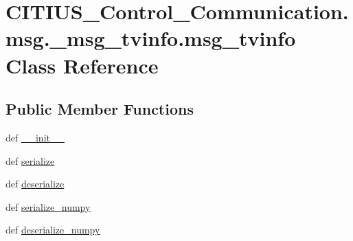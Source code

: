 \hypertarget{class_c_i_t_i_u_s___control___communication_1_1msg_1_1__msg__tvinfo_1_1msg__tvinfo}{\section{\-C\-I\-T\-I\-U\-S\-\_\-\-Control\-\_\-\-Communication.\-msg.\-\_\-msg\-\_\-tvinfo.\-msg\-\_\-tvinfo \-Class \-Reference}
\label{class_c_i_t_i_u_s___control___communication_1_1msg_1_1__msg__tvinfo_1_1msg__tvinfo}
}
\subsection*{\-Public \-Member \-Functions}
\begin{DoxyCompactItemize}
\item 
def \hyperlink{class_c_i_t_i_u_s___control___communication_1_1msg_1_1__msg__tvinfo_1_1msg__tvinfo_a8da74993f471f7e5e65a29e4700241ef}{\-\_\-\-\_\-init\-\_\-\-\_\-}
\item 
def \hyperlink{class_c_i_t_i_u_s___control___communication_1_1msg_1_1__msg__tvinfo_1_1msg__tvinfo_a410ec4f49b3f222d57452fb70d6b0916}{serialize}
\item 
def \hyperlink{class_c_i_t_i_u_s___control___communication_1_1msg_1_1__msg__tvinfo_1_1msg__tvinfo_a50ab42eece6779ff9ae74374d3750b74}{deserialize}
\item 
def \hyperlink{class_c_i_t_i_u_s___control___communication_1_1msg_1_1__msg__tvinfo_1_1msg__tvinfo_a61d1a1302552cfb010b8fad1144345bc}{serialize\-\_\-numpy}
\item 
def \hyperlink{class_c_i_t_i_u_s___control___communication_1_1msg_1_1__msg__tvinfo_1_1msg__tvinfo_ab06036686cb1e9907755fac9efe02504}{deserialize\-\_\-numpy}
\end{DoxyCompactItemize}
